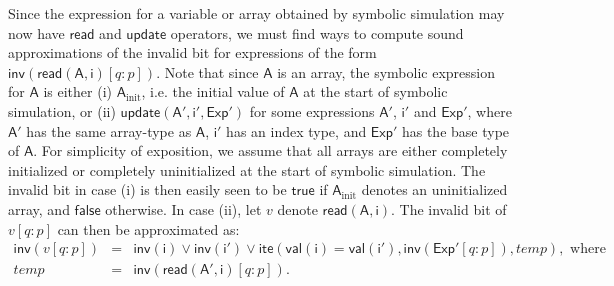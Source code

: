 \documentclass{llncs}
\newcommand{\val}{\ensuremath{\mathsf{val}}}
\newcommand{\inv}{\ensuremath{\mathsf{inv}}}
\newcommand{\ite}{\ensuremath{\mathsf{ite}}}
\newcommand{\true}{\ensuremath{\mathsf{true}}}
\newcommand{\false}{\ensuremath{\mathsf{false}}}
\newcommand{\arread}{\ensuremath{\mathsf{read}}}
\newcommand{\arupdate}{\ensuremath{\mathsf{update}}}
\begin{document}
Since the expression for a variable or array obtained by symbolic
simulation may now have ${\arread}$ and ${\arupdate}$ operators, we
must find ways to compute sound approximations of the invalid bit for
expressions of the form ${\inv}({\arread}(\mathsf{A},
\mathsf{i})[q:p])$. Note that since $\mathsf{A}$ is an array, the
symbolic expression for $\mathsf{A}$ is either (i)
$\mathsf{A}_{\text{init}}$, i.e. the initial value of $\mathsf{A}$ at
the start of symbolic simulation, or (ii) ${\arupdate}(\mathsf{A}',
\mathsf{i}', \mathsf{Exp}')$ for some expressions $\mathsf{A}'$,
$\mathsf{i}'$ and $\mathsf{Exp}'$, where $\mathsf{A}'$ has the same
array-type as $\mathsf{A}$, $\mathsf{i}'$ has an index type, and
$\mathsf{Exp}'$ has the base type of $\mathsf{A}$.  For simplicity of
exposition, we assume that all arrays are either completely
initialized or completely uninitialized at the start of symbolic
simulation.  The invalid bit in case (i) is then easily seen to be
${\true}$ if $\mathsf{A}_{\text{init}}$ denotes an uninitialized
array, and ${\false}$ otherwise.  In case (ii), let $v$ denote
${\arread}(\mathsf{A}, \mathsf{i})$.  The invalid bit of $v[q:p]$ can
then be approximated as:
\begin{eqnarray}
{\inv}(v[q:p]) & =&   {\inv}(\mathsf{i}) \vee {\inv}(\mathsf{i}')\vee 
{\ite}\left({\val}(\mathsf{i}) = {\val}(\mathsf{i}'), {\inv}(\mathsf{Exp}'[q:p]), temp\right), \text{ where} \nonumber\\
temp & = &{\inv}({\arread}(\mathsf{A}', \mathsf{i})[q:p]).\nonumber \end{eqnarray}
\end{document}

